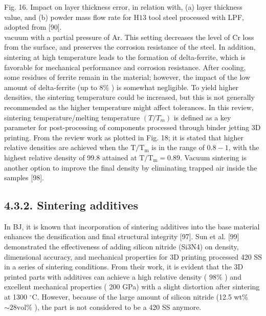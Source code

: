 \documentclass[10pt]{article}
\begin{document}
Fig. 16. Impact on layer thickness error, in relation with, (a) layer thickness value, and (b) powder mass flow rate for $\mathrm{H} 13$ tool steel processed with LPF, adopted from [90].\\
vacuum with a partial pressure of Ar. This setting decreases the level of Cr loss from the surface, and preserves the corrosion resistance of the steel. In addition, sintering at high temperature leads to the formation of delta-ferrite, which is favorable for mechanical performance and corrosion resistance. After cooling, some residues of ferrite remain in the material; however, the impact of the low amount of delta-ferrite (up to $8 \%$ ) is somewhat negligible. To yield higher densities, the sintering temperature could be increased, but this is not generally recommended as the higher temperature might affect tolerances. In this review, sintering temperature/melting temperature $\left(T / T_{m}\right)$ is defined as a key parameter for post-processing of components processed through binder jetting 3D printing. From the review work as plotted in Fig. 18; it is stated that higher relative densities are achieved when the $\mathrm{T} / \mathrm{T}_{\mathrm{m}}$ is in the range of $0.8-1$, with the highest relative density of 99.8 attained at $\mathrm{T} / \mathrm{T}_{\mathrm{m}}=0.89$. Vacuum sintering is another option to improve the final density by eliminating trapped air inside the samples [98].

\subsection*{4.3.2. Sintering additives}
In BJ, it is known that incorporation of sintering additives into the base material enhances the densification and final structural integrity [97]. Sun et al. [99] demonstrated the effectiveness of adding silicon nitride (Si3N4) on density, dimensional accuracy, and mechanical properties for 3D printing processed 420 SS in a series of sintering conditions. From their work, it is evident that the 3D printed parts with additives can achieve a high relative density ( $98 \%$ ) and excellent mechanical properties ( 200 GPa) with a slight distortion after sintering at 1300 ${ }^{\circ} \mathrm{C}$. However, because of the large amount of silicon nitride (12.5 wt\% $\sim 28 \mathrm{vol} \%$ ), the part is not considered to be a 420 SS anymore.
\end{document}

